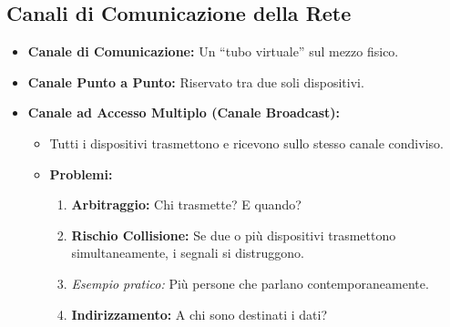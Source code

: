 \subsection{Canali di Comunicazione della Rete}
\begin{itemize}
    \item \textbf{Canale di Comunicazione:} Un “tubo virtuale” sul mezzo fisico.
    \item \textbf{Canale Punto a Punto:} Riservato tra due soli dispositivi.
    \item \textbf{Canale ad Accesso Multiplo (Canale Broadcast):}
    \begin{itemize}
        \item Tutti i dispositivi trasmettono e ricevono sullo stesso canale condiviso.
        \item \textbf{Problemi:}
        \begin{enumerate}
            \item \textbf{Arbitraggio:} Chi trasmette? E quando?
            \item \textbf{Rischio Collisione:} Se due o più dispositivi trasmettono simultaneamente, i segnali si distruggono.
            \item \textit{Esempio pratico:} Più persone che parlano contemporaneamente.
            \item \textbf{Indirizzamento:} A chi sono destinati i dati?
        \end{enumerate}
    \end{itemize}
\end{itemize}

